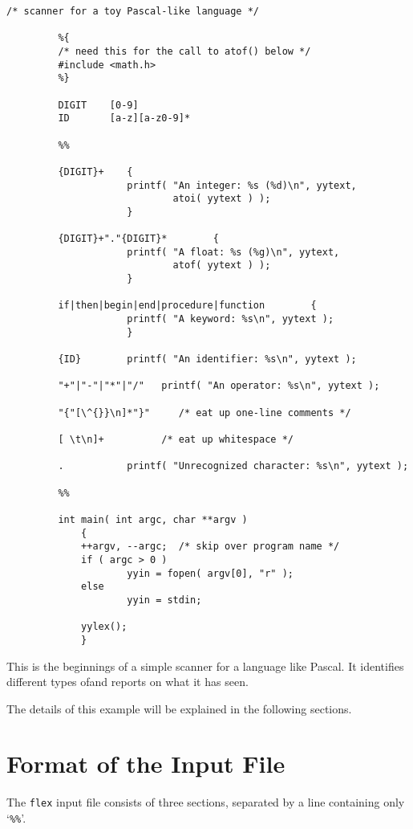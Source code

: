 \documentclass[openany,oneside]{book}
\begin{document}
\begin{verbatim}
/* scanner for a toy Pascal-like language */
     
         %{
         /* need this for the call to atof() below */
         #include <math.h>
         %}
     
         DIGIT    [0-9]
         ID       [a-z][a-z0-9]*
     
         %%
     
         {DIGIT}+    {
                     printf( "An integer: %s (%d)\n", yytext,
                             atoi( yytext ) );
                     }
     
         {DIGIT}+"."{DIGIT}*        {
                     printf( "A float: %s (%g)\n", yytext,
                             atof( yytext ) );
                     }
     
         if|then|begin|end|procedure|function        {
                     printf( "A keyword: %s\n", yytext );
                     }
     
         {ID}        printf( "An identifier: %s\n", yytext );
     
         "+"|"-"|"*"|"/"   printf( "An operator: %s\n", yytext );
     
         "{"[\^{}}\n]*"}"     /* eat up one-line comments */
     
         [ \t\n]+          /* eat up whitespace */
     
         .           printf( "Unrecognized character: %s\n", yytext );
     
         %%
     
         int main( int argc, char **argv )
             {
             ++argv, --argc;  /* skip over program name */
             if ( argc > 0 )
                     yyin = fopen( argv[0], "r" );
             else
                     yyin = stdin;
     
             yylex();
             }
\end{verbatim}


This is the beginnings of a simple scanner for a language like Pascal. 
It identifies different types ofand reports on what it has
seen.

The details of this example will be explained in the following
sections.
\chapter{Format of the Input File}


The \verb`flex` input file consists of three sections, separated by a
line containing only ‘\verb`%%`’.
\end{document}
